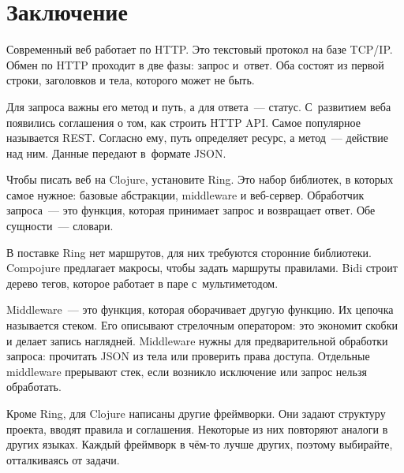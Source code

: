 \section{Заключение}

Современный веб работает по HTTP. Это текстовый протокол на базе TCP/IP. Обмен
по HTTP проходит в две фазы: запрос и~ответ. Оба состоят из первой строки,
заголовков и тела, которого может не быть.

Для запроса важны его метод и путь, а для ответа~--- статус. С~развитием веба
появились соглашения о том, как строить HTTP API. Самое популярное называется
REST. Согласно ему, путь определяет ресурс, а метод~--- действие над ним. Данные
передают в~формате JSON.

Чтобы писать веб на Clojure, установите Ring. Это набор библиотек, в которых
самое нужное: базовые абстракции, middleware и веб-сервер. Обработчик запроса~---
это функция, которая принимает запрос и возвращает ответ. Обе сущности~--- словари.

В поставке Ring нет маршрутов, для них требуются сторонние библиотеки. Compojure
предлагает макросы, чтобы задать маршруты правилами. Bidi строит дерево тегов,
которое работает в паре с~мультиметодом.

Middleware~--- это функция, которая оборачивает другую функцию. Их цепочка
называется стеком. Его описывают стрелочным оператором: это экономит скобки и
делает запись наглядней. Middleware нужны для предварительной обработки запроса:
прочитать JSON из тела или проверить права доступа. Отдельные middleware
прерывают стек, если возникло исключение или запрос нельзя обработать.

Кроме Ring, для Clojure написаны другие фреймворки. Они задают структуру
проекта, вводят правила и соглашения. Некоторые из них повторяют аналоги в
других языках. Каждый фреймворк в чём-то лучше других, поэтому выбирайте,
отталкиваясь от задачи.

